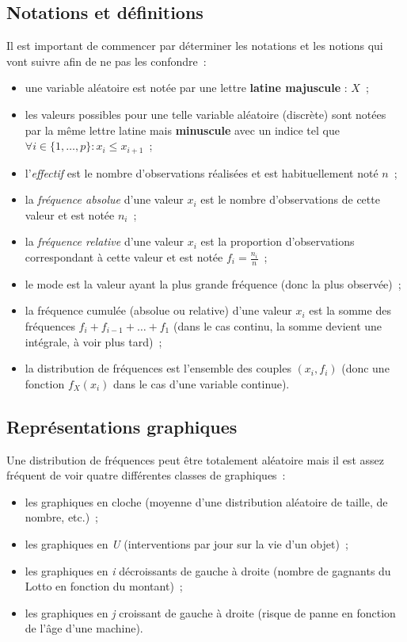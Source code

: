 \documentclass{article}
\begin{document}
	\subsection{Notations et définitions}
		Il est important de commencer par déterminer les notations et les notions qui vont suivre afin de ne pas les confondre~:
		\begin{itemize}
			\item une variable aléatoire est notée par une lettre \textbf{latine majuscule} : $X$~;
			\item les valeurs possibles pour une telle variable aléatoire (discrète) sont notées par la même lettre latine mais \textbf{minuscule} avec un
			indice tel que $\forall i \in \{1, \ldots, p\} : x_i \leq x_{i+1}$~;
			\item l'\textit{effectif} est le nombre d'observations réalisées et est habituellement noté $n$~;
			\item la \textit{fréquence absolue} d'une valeur $x_i$ est le nombre d'observations de cette valeur et est notée $n_i$~;
			\item la \textit{fréquence relative} d'une valeur $x_i$ est la proportion d'observations correspondant à cette valeur et est notée $f_i = \frac {n_i}n$~;
			\item le mode est la valeur ayant la plus grande fréquence (donc la plus observée)~;
			\item la fréquence cumulée (absolue ou relative) d'une valeur $x_i$ est la somme des fréquences $f_i + f_{i-1} + \ldots + f_1$ (dans le cas continu, la
			somme devient une intégrale, à voir plus tard)~;
			\item la distribution de fréquences est l'ensemble des couples $(x_i, f_i)$ (donc une fonction $f_X(x_i)$ dans le cas d'une variable continue).
		\end{itemize}

	\subsection{Représentations graphiques}
		Une distribution de fréquences peut être totalement aléatoire mais il est assez fréquent de voir quatre différentes classes de graphiques~:

		\begin{itemize}
			\item les graphiques en cloche (moyenne d'une distribution aléatoire de taille, de nombre, etc.)~;
			\item les graphiques en \textit{U} (interventions par jour sur la vie d'un objet)~;
			\item les graphiques en \textit{i} décroissants de gauche à droite (nombre de gagnants du Lotto en fonction du montant)~;
			\item les graphiques en \textit{j} croissant de gauche à droite (risque de panne en fonction de l'âge d'une machine).
		\end{itemize}
\end{document}
